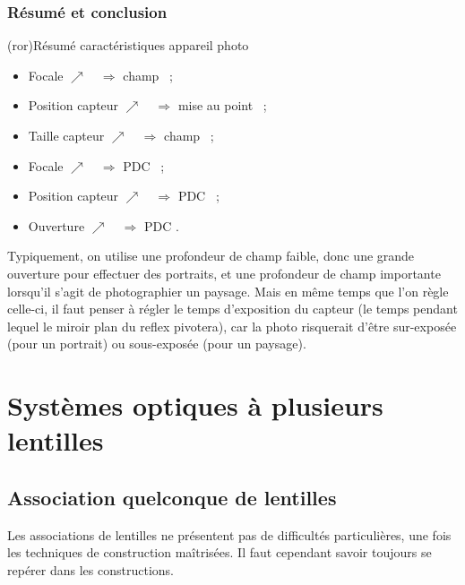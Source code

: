 \documentclass[../../main/main.tex]{subfiles}
\begin{document}
\subsubsection{Résumé et conclusion}
\begin{tcb}[label=ror:app_phot](ror){Résumé caractéristiques appareil photo}
	\begin{minipage}{0.50\linewidth}
		\begin{itemize}[label=$\diamond$, leftmargin=10pt]
			\item Focale $\nearrow\quad\Rightarrow$ champ \psw{$\searrow$}~;
			\item Position capteur $\nearrow\quad\Rightarrow$ mise au point
			      \psw{$\searrow$}~;
			\item Taille capteur $\nearrow\quad\Rightarrow$ champ \psw{$\nearrow$}~;
		\end{itemize}
	\end{minipage}
	\begin{minipage}{0.50\linewidth}
		\begin{itemize}[label=$\diamond$, leftmargin=10pt]
			\item Focale $\nearrow\quad\Rightarrow$ PDC \psw{$\searrow$}~;
			\item Position capteur $\nearrow\quad\Rightarrow$ PDC \psw{$\searrow$}~;
			\item Ouverture $\nearrow\quad\Rightarrow$ PDC \psw{$\searrow$}.
		\end{itemize}
	\end{minipage}
\end{tcb}

Typiquement, on utilise une profondeur de champ faible, donc une grande
ouverture pour effectuer des portraits, et une profondeur de champ importante
lorsqu'il s'agit de photographier un paysage.\newline
Mais en même temps que l'on règle celle-ci, il faut penser à régler le temps
d'exposition du capteur (le temps pendant lequel le miroir plan du reflex
pivotera), car la photo risquerait d'être sur-exposée (pour un portrait) ou
sous-exposée (pour un paysage).

\section{Systèmes optiques à plusieurs lentilles}

\subsection{Association quelconque de lentilles}
Les associations de lentilles ne présentent pas de difficultés particulières,
une fois les techniques de construction maîtrisées. Il faut cependant savoir
toujours se repérer dans les constructions.
\end{document}
